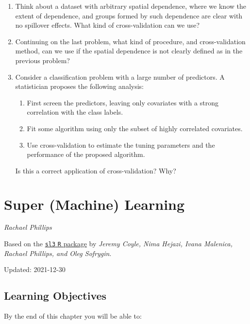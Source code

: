 \documentclass[
  12pt, krantz2,
]{krantz}
\newcommand{\passthrough}[1]{#1}
\providecommand{\tightlist}{%
  \setlength{\itemsep}{0pt}\setlength{\parskip}{0pt}}
\newcommand{\1}{\mathbbm{1}}
\theoremstyle{definition}
\theoremstyle{definition}
\theoremstyle{definition}
\theoremstyle{definition}
\theoremstyle{remark}
\begin{document}
\begin{enumerate}
\def\labelenumi{\arabic{enumi}.}
\item
  Think about a dataset with arbitrary spatial dependence, where we know
  the extent of dependence, and groups formed by such dependence are clear
  with no spillover effects. What kind of cross-validation can we use?
\item
  Continuing on the last problem, what kind of procedure, and cross-validation
  method, can we use if the spatial dependence is not clearly defined as in the
  previous problem?
\item
  Consider a classification problem with a large number of predictors. A
  statistician proposes the following analysis:

  \begin{enumerate}
  \def\labelenumii{\alph{enumii}.}
  \tightlist
  \item
    First screen the predictors, leaving only covariates with a strong
    correlation with the class labels.
  \item
    Fit some algorithm using only the subset of highly correlated covariates.
  \item
    Use cross-validation to estimate the tuning parameters and the performance
    of the proposed algorithm.
  \end{enumerate}

  Is this a correct application of cross-validation? Why?
\end{enumerate}

\hypertarget{sl3}{%
\chapter{Super (Machine) Learning}\label{sl3}}

\emph{Rachael Phillips}

Based on the \href{https://github.com/tlverse/sl3}{\passthrough{\lstinline!sl3!} \passthrough{\lstinline!R!} package} by \emph{Jeremy
Coyle, Nima Hejazi, Ivana Malenica, Rachael Phillips, and Oleg Sofrygin}.

Updated: 2021-12-30

\hypertarget{learning-objectives}{%
\section*{Learning Objectives}\label{learning-objectives}}


By the end of this chapter you will be able to:
\end{document}
